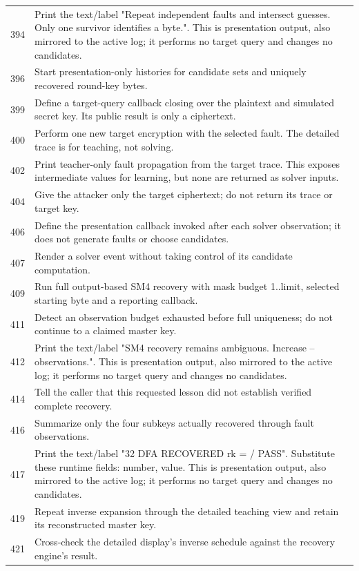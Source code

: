 \begin{longtable}{r >{\raggedright\arraybackslash}p{138mm}}
394&Print the text/label "Repeat independent faults and intersect guesses. Only one survivor identifies a byte.". This is presentation output, also mirrored to the active log; it performs no target query and changes no candidates.\\
396&Start presentation-only histories for candidate sets and uniquely recovered round-key bytes.\\
399&Define a target-query callback closing over the plaintext and simulated secret key. Its public result is only a ciphertext.\\
400&Perform one new target encryption with the selected fault. The detailed trace is for teaching, not solving.\\
402&Print teacher-only fault propagation from the target trace. This exposes intermediate values for learning, but none are returned as solver inputs.\\
404&Give the attacker only the target ciphertext; do not return its trace or target key.\\
406&Define the presentation callback invoked after each solver observation; it does not generate faults or choose candidates.\\
407&Render a solver event without taking control of its candidate computation.\\
409&Run full output-based SM4 recovery with mask budget 1..limit, selected starting byte and a reporting callback.\\
411&Detect an observation budget exhausted before full uniqueness; do not continue to a claimed master key.\\
412&Print the text/label "SM4 recovery remains ambiguous. Increase --observations.". This is presentation output, also mirrored to the active log; it performs no target query and changes no candidates.\\
414&Tell the caller that this requested lesson did not establish verified complete recovery.\\
416&Summarize only the four subkeys actually recovered through fault observations.\\
417&Print the text/label "32 DFA RECOVERED rk  =   / PASS". Substitute these runtime fields: number, value. This is presentation output, also mirrored to the active log; it performs no target query and changes no candidates.\\
419&Repeat inverse expansion through the detailed teaching view and retain its reconstructed master key.\\
421&Cross-check the detailed display's inverse schedule against the recovery engine's result.\\

\end{longtable}
